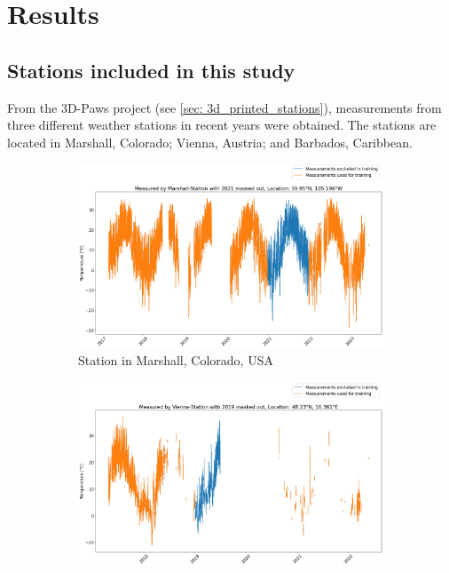 \section{Results}
\label{sec: results}

\subsection{Stations included in this study}

From the 3D-Paws project (see \autoref{sec: 3d_printed_stations}), measurements from three different weather stations in recent years were obtained. The stations are located in Marshall, Colorado; Vienna, Austria; and Barbados, Caribbean.

\begin{figure}
\centering
\begin{subfigure}{0.672\textwidth}
\includegraphics[width=\textwidth]{resources/images/charts/marshall_available_measurements.png}
\caption{Station in Marshall, Colorado, USA}
\label{fig: available_measurements_marshall}
\end{subfigure}
\begin{subfigure}{0.672\textwidth}
\includegraphics[width=\textwidth]{resources/images/charts/vienna_available_measurements.png}

\end{subfigure}
\end{figure}
